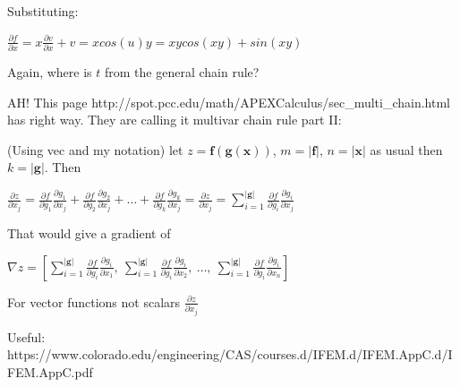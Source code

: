 \documentclass[11pt]{article}
\begin{document}
{Substituting:

$\frac{\partial f}{\partial x} = x\frac{\partial v}{\partial x} + v = xcos(u)y = xycos(xy) + sin(xy)$

Again, where is $t$ from the general chain rule?

AH! This page http://spot.pcc.edu/math/APEXCalculus/sec\_multi\_chain.html has right way. They are calling it multivar chain rule part II:

(Using vec and my notation) let $z = \mathbf{f(g(x))}$, $m = |\mathbf{f}|$, $n=|\mathbf{x}|$ as usual then $k=|\mathbf{g}|$. Then

$\frac{\partial z}{\partial x_j} = \frac{\partial f}{\partial g_1}\frac{\partial g_1}{\partial x_j} + \frac{\partial f}{\partial g_2}\frac{\partial g_2}{\partial x_j} + \ldots + \frac{\partial f}{\partial g_k}\frac{\partial g_k}{\partial x_j} = \frac{\partial z}{\partial x_j} =  \sum_{i=1}^{|\mathbf{g}|} \frac{\partial f}{\partial g_i}\frac{\partial g_i}{\partial x_j}$

That would give a gradient of

$\nabla z = \left[ \sum_{i=1}^{|\mathbf{g}|} \frac{\partial f}{\partial g_i}\frac{\partial g_i}{\partial x_1},~ \sum_{i=1}^{|\mathbf{g}|} \frac{\partial f}{\partial g_i}\frac{\partial g_i}{\partial x_2}, ~\ldots,~ \sum_{i=1}^{|\mathbf{g}|} \frac{\partial f}{\partial g_i}\frac{\partial g_i}{\partial x_n} \right]$

For vector functions not scalars
$\frac{\partial z}{\partial x_j}$

Useful: https://www.colorado.edu/engineering/CAS/courses.d/IFEM.d/IFEM.AppC.d/IFEM.AppC.pdf
}
\end{document}
